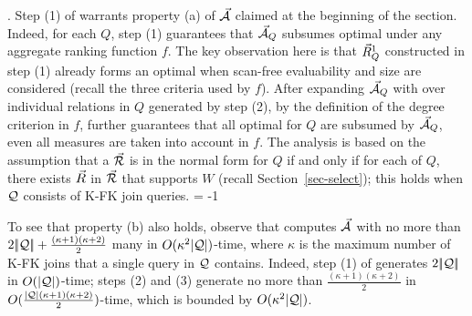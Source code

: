 .
Step (1) of \usc warrants property (a) of $\vec{{\mathcal A}}$ claimed at
the beginning of the section. Indeed, for each $Q$, step (1)
guarantees that $\vec{{\mathcal A}}_{Q}$ subsumes optimal \bdss under
any aggregate ranking function $f$.
The key observation
here is that $\vec{R}_{Q}^{1}$ constructed in step (1) already forms an
optimal \bds when scan-free evaluability and size are considered
(recall the three criteria used by $f$).
After expanding $\vec{{\mathcal A}}_{Q}$ with \bss over individual relations
in $Q$ generated by step (2), by the definition of the degree
criterion in $f$, \usc further guarantees that all optimal \bdss for $Q$ are subsumed by
$\vec{{\mathcal A}}_{Q}$, even all measures are taken into account in $f$.
The analysis is based on the assumption that a \bds $\vec{{\mathcal R}}$ is
in the normal form for $Q$ if and only if for each \qcs of $Q$, there
exists \bs $\vec{R}$ in $\vec{{\mathcal R}}$ that supports $W$ (recall
Section~\ref{sec-select}); this holds when $\mathcal Q$
consists of K-FK join \SPC queries.
\looseness = -1



\vspace{0.36ex}

To see that property (b) also holds,
observe that \usc computes $\vec{{\mathcal A}}$ with
no more than $2|\!|{\mathcal Q}|\!| + \frac{(\kappa+1)(\kappa+2)}{2}$
many \bss in $O(\kappa^{2}|{\mathcal Q}|)$-time, where $\kappa$ is the
maximum number of K-FK joins that a single query in $\mathcal Q$
contains. Indeed, step (1) of \usc generates $2|\!|{\mathcal Q}|\!|$ \bss in
$O(|{\mathcal Q}|)$-time; steps (2) and (3) generate no more than
$\frac{(\kappa+1)(\kappa+2)}{2}$ \bss in
$O(\frac{|{\mathcal Q}|(\kappa+1)(\kappa+2)}{2})$-time, which is bounded
by $O(\kappa^{2}|{\mathcal Q}|)$.

